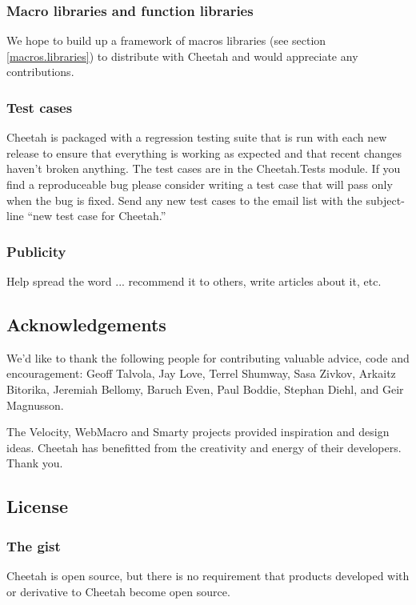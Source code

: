 \subsubsection{Macro libraries and function libraries}
We hope to build up a framework of macros libraries (see section
\ref{macros.libraries}) to distribute with Cheetah and would appreciate
any contributions.

\subsubsection{Test cases}
Cheetah is packaged with a regression testing suite that is run with each
new release to ensure that everything is working as expected and that recent
changes haven't broken anything.  The test cases are in the Cheetah.Tests
module.  If you find a reproduceable bug please consider writing a test case
that will pass only when the bug is fixed.  Send any new test cases to the email
list with the subject-line ``new test case for Cheetah.''

\subsubsection{Publicity}
Help spread the word ... recommend it to others, write articles about it, etc.

\subsection{Acknowledgements}
\label{intro.acknowledgments}
    
We'd like to thank the following people for contributing valuable advice, code
and encouragement: Geoff Talvola, Jay Love, Terrel Shumway, Sasa Zivkov, Arkaitz
Bitorika, Jeremiah Bellomy, Baruch Even, Paul Boddie, Stephan Diehl, and Geir
Magnusson.
    
The Velocity, WebMacro and Smarty projects provided inspiration and design
ideas.  Cheetah has benefitted from the creativity and energy of their
developers. Thank you.

\subsection{License}
\label{intro.license}

\subsubsection{The gist}
Cheetah is open source, but there is no requirement that products developed with
or derivative to Cheetah become open source.

